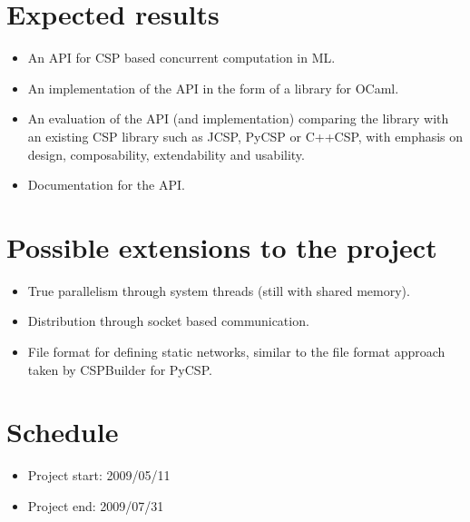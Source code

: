 \documentclass[a4paper,12pt]{article}
\begin{document}
\section*{Expected results}
\begin{itemize}
 \item An API for CSP based concurrent computation in ML.
 \item An implementation of the API in the form of a library for OCaml.
 \item An evaluation of the API (and implementation) comparing
   the library with an existing CSP library such as JCSP, PyCSP or C++CSP,
   with emphasis on design, composability, extendability and usability.
 \item Documentation for the API.
\end{itemize}

\section*{Possible extensions to the project}
\begin{itemize}
 \item True parallelism through system threads (still with shared memory).
 \item Distribution through socket based communication.
 \item File format for defining static networks, similar to the file format 
   approach taken by CSPBuilder for PyCSP.
\end{itemize}

\section*{Schedule}
\begin{itemize}
 \item Project start: 2009/05/11
 \item Project end: 2009/07/31
\end{itemize}
\end{document}
